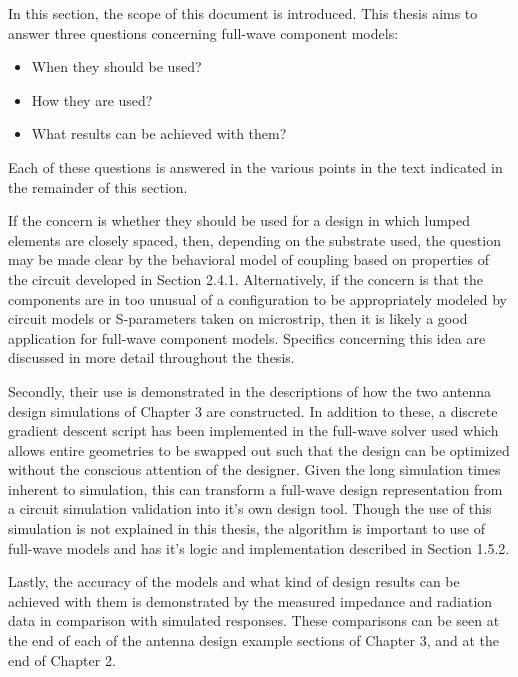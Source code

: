 \documentclass[12pt]{usfcoe}
\begin{document}
    In this section, the scope of this document is introduced. 
    This thesis aims to answer three questions concerning full-wave component models: 
    \vspace{-\topsep}
    \begin{itemize}
        \setlength{\parskip}{0pt}
        \setlength{\itemsep}{0pt} 
        \item When they should be used?
        \item How they are used?
        \item What results can be achieved with them?
    \end{itemize}
    \vspace*{-9pt}
    Each of these questions is answered in the various points in the text indicated in the remainder of this section.
    
    \indent If the concern is whether they should be used for a design in which lumped elements are closely spaced, then, depending on the substrate used, the question may be made clear by the behavioral model of coupling based on properties of the circuit developed in Section 2.4.1.
    Alternatively, if the concern is that the components are in too unusual of a configuration to be appropriately modeled by circuit models or S-parameters taken on microstrip, then it is likely a good application for full-wave component models.
    Specifics concerning this idea are discussed in more detail throughout the thesis.

    \indent Secondly, their use is demonstrated in the descriptions of how the two antenna design simulations of Chapter 3 are constructed. 
    In addition to these, a discrete gradient descent script has been implemented in the full-wave solver used which allows entire geometries to be swapped out such that the design can be optimized without the conscious attention of the designer.
    Given the long simulation times inherent to simulation, this can transform a full-wave design representation from a circuit simulation validation into it's own design tool.
    Though the use of this simulation is not explained in this thesis, the algorithm is important to use of full-wave models and has it's logic and implementation described in Section 1.5.2.
    
    \indent Lastly, the accuracy of the models and what kind of design results can be achieved with them is demonstrated by the measured impedance and radiation data in comparison with simulated responses.
    These comparisons can be seen at the end of each of the antenna design example sections of Chapter 3, and at the end of Chapter 2.
    
\end{document}
